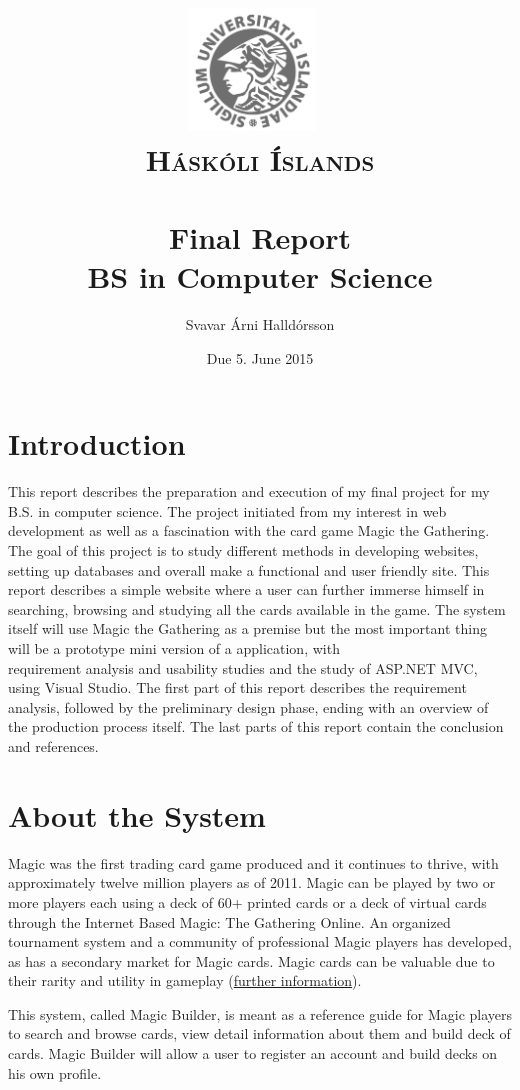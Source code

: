 \documentclass[paper=a4, fontsize=11pt]{scrartcl} %
\title{ 
\normalfont \normalsize 
\includegraphics[width=0.25\textwidth]{logo.jpg}~\\[1cm]
\textsc{Háskóli Íslands} \\ [25pt] %
\horrule{0.5pt} \\[0.4cm] %
\huge {Final Report \\ BS in Computer Science} %
\horrule{2pt} \\[0.5cm] %
}
\author{Svavar Árni Halldórsson} %
\date{\normalsize Due 5. June 2015} %
\numberwithin{equation}{section} %
\numberwithin{figure}{section} %
\numberwithin{table}{section} %
\begin{document}
\maketitle
\clearpage

\hypersetup {
  linkcolor = black
}
\tableofcontents
\hypersetup {
  linkcolor = ForestGreen,
  urlcolor = ForestGreen
}
\clearpage
\section{Introduction}
This report describes the preparation and execution of my final project for my B.S. in computer science. The project initiated from my interest in web development as well as a fascination with the card game Magic the Gathering. The goal of this project is to study different methods in developing websites, setting up databases and overall make a functional and user friendly site. This report describes a simple website where a user can further immerse himself in searching, browsing and studying all the cards available in the game. The system itself will use Magic the Gathering as a premise but the most important thing will be a prototype mini version of a application, with 
 \\ requirement analysis and usability studies and the study of ASP.NET MVC, using Visual Studio. The first part of this report describes the requirement analysis, followed by the preliminary design phase, ending with an overview of the production process itself. The last parts of this report contain the conclusion and references.

\section{About the System}
Magic was the first trading card game produced and it continues to thrive, with approximately twelve million players as of 2011. Magic can be played by two or more players each using a deck of 60+ printed cards or a deck of virtual cards through the Internet Based Magic: The Gathering Online. An organized tournament system and a community of professional Magic players has developed, as has a secondary market for Magic cards. Magic cards can be valuable due to their rarity and utility in gameplay (\href{http://en.wikipedia.org/wiki/Magic:_The_Gathering}{further information}).
  
This system, called Magic Builder, is meant as a reference guide for Magic players to search and browse cards, view detail information about them and build deck of cards. Magic Builder will allow a user to register an account and build decks on his own profile.
\end{document}
